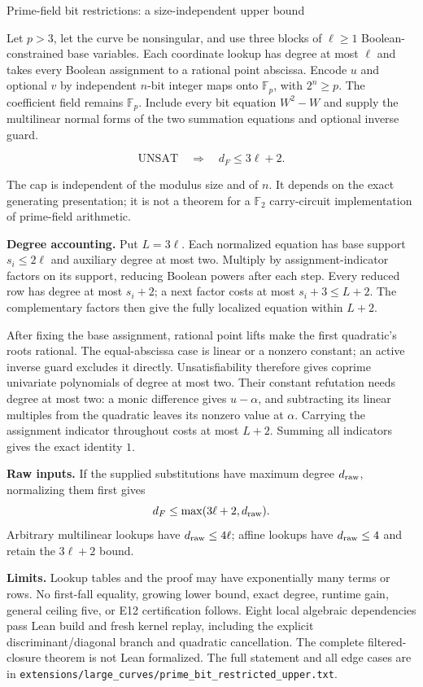 \documentclass[11pt]{article}
\begin{document}
\newpage
\begin{center}
{\Large Prime-field bit restrictions: a size-independent upper bound}
\end{center}

Let $p>3$, let the curve be nonsingular, and use three blocks of $\ell\ge1$
Boolean-constrained base variables. Each coordinate lookup has degree at most
$\ell$ and takes every Boolean assignment to a rational point abscissa.
Encode $u$ and optional $v$ by independent $n$-bit integer maps onto
$\mathbb F_p$, with $2^n\ge p$. The coefficient field remains $\mathbb F_p$.
Include every bit equation $W^2-W$ and supply the multilinear normal forms of
the two summation equations and optional inverse guard.

\[
\boxed{\text{UNSAT}\quad\Longrightarrow\quad d_F\le3\ell+2.}
\]

The cap is independent of the modulus size and of $n$. It depends on the
exact generating presentation; it is not a theorem for a $\mathbb F_2$
carry-circuit implementation of prime-field arithmetic.

\textbf{Degree accounting.} Put $L=3\ell$. Each normalized equation has
base support $s_i\le2\ell$ and auxiliary degree at most two. Multiply by
assignment-indicator factors on its support, reducing Boolean powers after
each step. Every reduced row has degree at most $s_i+2$; a next factor costs
at most $s_i+3\le L+2$. The complementary factors then give the fully
localized equation within $L+2$.

After fixing the base assignment, rational point lifts make the first
quadratic's roots rational. The equal-abscissa case is linear or a nonzero
constant; an active inverse guard excludes it directly. Unsatisfiability
therefore gives coprime univariate polynomials of degree at most two.
Their constant refutation needs degree at most two: a monic difference gives
$u-\alpha$, and subtracting its linear multiples from the quadratic leaves
its nonzero value at $\alpha$. Carrying the assignment indicator throughout
costs at most $L+2$. Summing all indicators gives the exact identity $1$.

\textbf{Raw inputs.} If the supplied substitutions have maximum degree
$d_{\rm raw}$, normalizing them first gives
\[
d_F\le\max(3\ell+2,d_{\rm raw}).
\]
Arbitrary multilinear lookups have $d_{\rm raw}\le4\ell$; affine lookups
have $d_{\rm raw}\le4$ and retain the $3\ell+2$ bound.

\textbf{Limits.} Lookup tables and the proof may have exponentially many
terms or rows. No first-fall equality, growing lower bound, exact degree,
runtime gain, general ceiling five, or E12 certification follows.
Eight local algebraic dependencies pass Lean build and fresh kernel replay,
including the explicit discriminant/diagonal branch and quadratic cancellation.
The complete filtered-closure theorem is not Lean formalized.
The full statement and all edge cases are in
\texttt{extensions/large\_curves/prime\_bit\_restricted\_upper.txt}.
\end{document}
